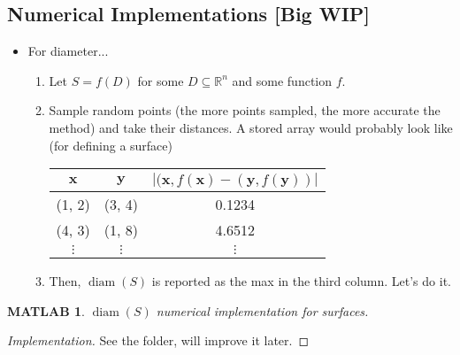 \documentclass[10pt]{article}
\theoremstyle{plain}
\newtheorem{matlab}{MATLAB}
\DeclareMathOperator{\diam}{diam}
\begin{document}
\subsection*{Numerical Implementations [Big WIP]}
	\begin{itemize}
		\item For diameter...
			\begin{enumerate}
				\item Let $S = f(D)$ for some $D \subseteq \mathbb{R}^n$ and some function $f$. 
				
				\item Sample random points (the more points sampled, the more accurate the method) and take their distances. A stored array would probably look like (for defining a surface)
					
					\begin{table}[H]
						\centering 
						\begin{tabular}{c|c|c}
							$\mathbf{x}$ & $\mathbf{y}$ & $|(\mathbf{x}, f(\mathbf{x}) - (\mathbf{y}, f(\mathbf{y}))|$ \\
							\hline  
							(1, 2) & (3, 4) & 0.1234 \\
							(4, 3) & (1, 8) & 4.6512 \\
							$\vdots$ & $\vdots$ & $\vdots$ 
						\end{tabular}						
					\end{table}
				
				\item Then, $\diam(S)$ is reported as the max in the third column. Let's do it.
			\end{enumerate}
	\end{itemize}

	\begin{matlab}
		$\diam(S)$ numerical implementation for surfaces. 
	\end{matlab}
		\begin{proof}[Implementation]
			See the folder, will improve it later. 
		\end{proof}
\end{document}
